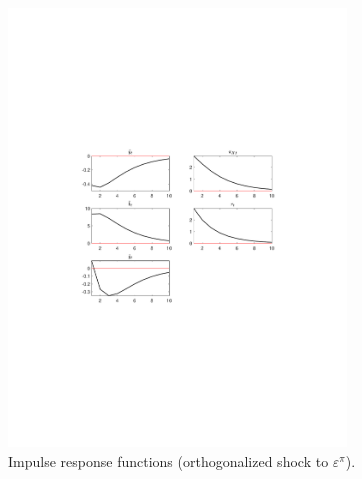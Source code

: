 \begin{figure}[H]
\centering 
\includegraphics[width=0.80\textwidth]{monetary/graphs/monetary_IRF_eps_pi}
\caption{Impulse response functions (orthogonalized shock to ${\varepsilon^{\pi}}$).}
\label{Fig:IRF:eps_pi}
\end{figure}
 
 
